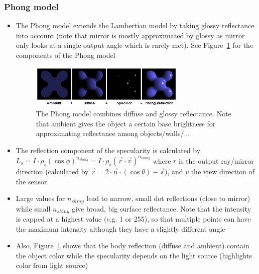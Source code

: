 \subsubsection{Phong model}
\begin{itemize}
	\item The Phong model extends the Lambertian model by taking glossy reflectance into account (note that mirror is mostly approximated by glossy as mirror only looks at a single output angle which is rarely met). See Figure~\ref{fig:reflection_models_phong} for the components of the Phong model
	\begin{figure}[ht!]
		\centering
		\includegraphics[width=0.7\textwidth]{figures/cv_image_formation_phong_model.png}
		\caption{The Phong model combines diffuse and glossy reflectance. Note that ambient gives the object a certain base brightness for approximating reflectance among objects/walls/...}
		\label{fig:reflection_models_phong}
	\end{figure}
	\item The reflection component of the specularity is calculated by $L_s=I\cdot \rho_s \left(\cos \phi\right)^{n_{shiny}}=I\cdot \rho_s \left(\vec{r}\cdot \vec{v}\right)^{n_{shiny}}$ where $r$ is the output ray/mirror direction (calculated by $\vec{r}=2\cdot \vec{n} \cdot (\cos \theta) - \vec{s}$), and $v$ the view direction of the sensor. 
	\item Large values for $n_{shiny}$ lead to narrow, small dot reflections (close to mirror) while small $n_{shiny}$ give broad, big surface reflectance. Note that the intensity is capped at a highest value (e.g. 1 or 255), so that multiple points can have the maximum intensity although they have a slightly different angle
	\item Also, Figure~\ref{fig:reflection_models_phong} shows that the body reflection (diffuse and ambient) contain the object color while the specularity depends on the light source (highlights color from light source)
\end{itemize}
